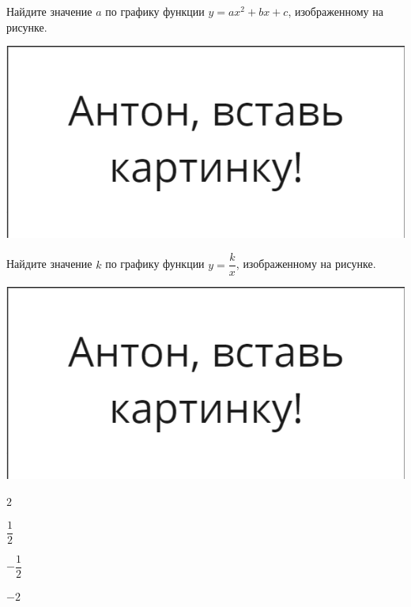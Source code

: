 \begin{class}[number=3]
	\begin{listofex}
			\item 
			\begin{minipage}[t]{0.57\textwidth}
				Найдите значение \( a \) по графику функции \( y=ax^2+bx+c \), изображенному на рисунке.
			\end{minipage}
			\begin{minipage}[c]{0.3\textwidth}
				\includegraphics[align=t, width=\textwidth]{pics/G91M4L4-1}
			\end{minipage}
		
				\item 
			\begin{minipage}[t]{0.57\textwidth}
				Найдите значение \( k \) по графику функции \( y=\dfrac{k}{x} \), изображенному на рисунке.
			\end{minipage}
			\begin{minipage}[c]{0.3\textwidth}
			\includegraphics[align=t, width=\textwidth]{pics/G91M4L4-1}
		\end{minipage}
			\begin{enumcols}[itemcolumns=4]
				\item \( 2 \)
				\item \( \dfrac{1}{2} \)
				\item \( -\dfrac{1}{2} \)
				\item \( -2 \)
			\end{enumcols}
		

\end{listofex}
\end{class}
